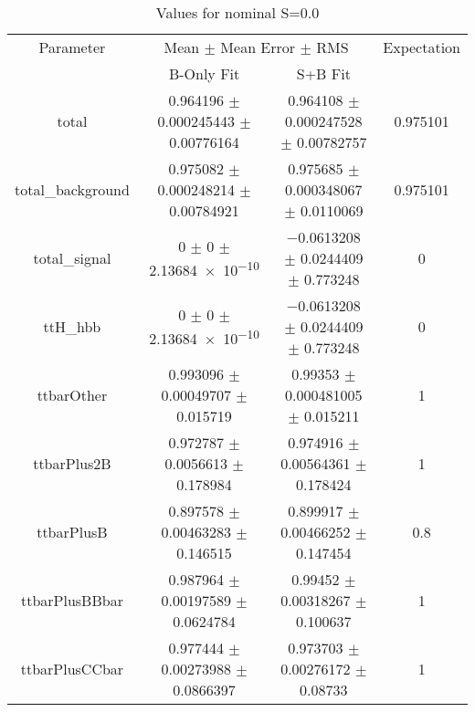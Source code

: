 \begin{table}
\centering
\caption{Values for nominal S=0.0}
\begin{tabular}{cccc}
\toprule
Parameter & \multicolumn{2}{c}{Mean $\pm$ Mean Error $\pm$ RMS} & Expectation\\
 & B-Only Fit & S+B Fit & \\
\midrule
total & \num{0.964196} $\pm$ \num{0.000245443} $\pm$ \num{0.00776164} & \num{0.964108} $\pm$ \num{0.000247528} $\pm$ \num{0.00782757} & \num{0.975101}\\
total\_background & \num{0.975082} $\pm$ \num{0.000248214} $\pm$ \num{0.00784921} & \num{0.975685} $\pm$ \num{0.000348067} $\pm$ \num{0.0110069} & \num{0.975101}\\
total\_signal & \num{0} $\pm$ \num{0} $\pm$ \num{2.13684e-10} & \num{-0.0613208} $\pm$ \num{0.0244409} $\pm$ \num{0.773248} & \num{0}\\
ttH\_hbb & \num{0} $\pm$ \num{0} $\pm$ \num{2.13684e-10} & \num{-0.0613208} $\pm$ \num{0.0244409} $\pm$ \num{0.773248} & \num{0}\\
ttbarOther & \num{0.993096} $\pm$ \num{0.00049707} $\pm$ \num{0.015719} & \num{0.99353} $\pm$ \num{0.000481005} $\pm$ \num{0.015211} & \num{1}\\
ttbarPlus2B & \num{0.972787} $\pm$ \num{0.0056613} $\pm$ \num{0.178984} & \num{0.974916} $\pm$ \num{0.00564361} $\pm$ \num{0.178424} & \num{1}\\
ttbarPlusB & \num{0.897578} $\pm$ \num{0.00463283} $\pm$ \num{0.146515} & \num{0.899917} $\pm$ \num{0.00466252} $\pm$ \num{0.147454} & \num{0.8}\\
ttbarPlusBBbar & \num{0.987964} $\pm$ \num{0.00197589} $\pm$ \num{0.0624784} & \num{0.99452} $\pm$ \num{0.00318267} $\pm$ \num{0.100637} & \num{1}\\
ttbarPlusCCbar & \num{0.977444} $\pm$ \num{0.00273988} $\pm$ \num{0.0866397} & \num{0.973703} $\pm$ \num{0.00276172} $\pm$ \num{0.08733} & \num{1}\\
\bottomrule
\end{tabular}
\end{table}